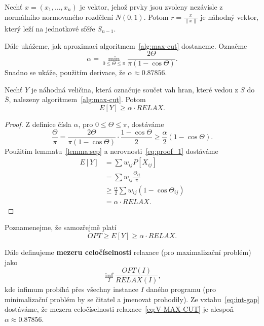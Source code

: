 \begin{lm}[KNUTH 2, 135]
    Nechť $x = (x_1, \dots, x_n)$ je vektor, jehož prvky jsou zvoleny nezávisle z normálního normovaného rozdělení $N(0,1)$. Potom $r = \frac{x}{\| x \|}$ je náhodný vektor, který leží na jednotkové sféře $S_{n-1}$.
\end{lm}

Dále ukážeme, jak  aproximaci algoritmem~\ref{alg:max-cut} dostaneme. Označme
$$
    \alpha = \min_{0 \leq \Theta \leq \pi} \frac{2 \Theta}{\pi (1 - \cos \Theta)}.
$$
Snadno se ukáže, použitím derivace, že $\alpha \approx 0.87856$.

\begin{lm}
    Nechť $Y$ je náhodná veličina, která označuje součet vah hran, které vedou z $S$ do $\bar{S}$, nalezeny algoritmem~\ref{alg:max-cut}. Potom
    $$
        E\left[ Y \right] \geq \alpha \cdot RELAX.
    $$
\end{lm}

\begin{proof}
    Z definice čísla $\alpha$, pro $0 \leq \Theta \leq \pi$, dostáváme
    \begin{equation}
        \frac{\Theta}{\pi} = \frac{2 \Theta}{\pi (1 - \cos \Theta)} \cdot \frac{1 - \cos \Theta}{2} \geq \frac{\alpha}{2} (1 - \cos \Theta).
        \label{eq:proof_1}
    \end{equation}
    Použitím lemmatu~\ref{lemma:sep} a nerovnosti~\ref{eq:proof_1} dostáváme
    \begin{equation*}
        \begin{split}
            E\left[ Y \right] &= \sum w_{ij} P\left[ X_{ij} \right] \\
                              &= \sum w_{ij} \frac{\Theta_{ij}}{\pi} \\
                              &\geq \frac{\alpha}{2} \sum w_{ij} (1 - \cos \Theta_{ij}) \\
                              &= \alpha \cdot RELAX.
        \end{split}
    \end{equation*}
\end{proof}

\noindent Poznamenejme, že samozřejmě platí
\begin{equation}
    OPT \geq E\left[ Y \right] \geq \alpha \cdot RELAX.
    \label{eq:int-gap}
\end{equation}

\noindent Dále definujeme \textbf{mezeru celočíselnosti} relaxace (pro maximalizační problém) jako
$$
    \inf_{I} \frac{OPT(I)}{RELAX(I)},
$$
kde infimum probíhá přes všechny instance $I$ daného programu (pro minimalizační problém by se čitatel a jmenovat prohodily). Ze vztahu~\ref{eq:int-gap} dostáváme, že mezera celočíselnosti relaxace~\ref{eq:V-MAX-CUT} je alespoň $\alpha \approx 0.87856$.

